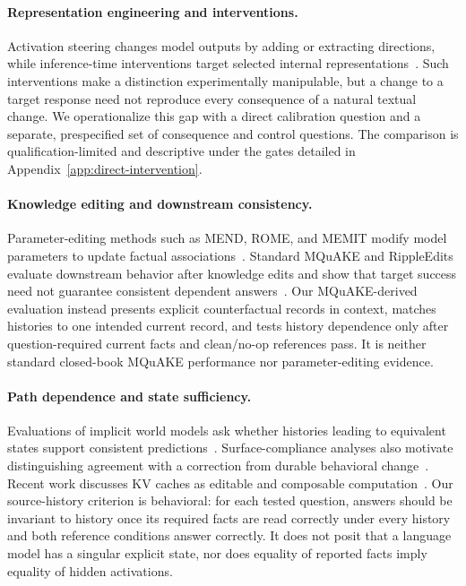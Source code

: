 \documentclass{article}
\begin{document}
\paragraph{Representation engineering and interventions.} Activation steering changes model outputs by adding or extracting directions, while inference-time interventions target selected internal representations~\citep{li2023inference,turner2023activation,zou2023representation}. Such interventions make a distinction experimentally manipulable, but a change to a target response need not reproduce every consequence of a natural textual change. We operationalize this gap with a direct calibration question and a separate, prespecified set of consequence and control questions. The comparison is qualification-limited and descriptive under the gates detailed in Appendix~\ref{app:direct-intervention}.

\paragraph{Knowledge editing and downstream consistency.} Parameter-editing methods such as MEND, ROME, and MEMIT modify model parameters to update factual associations~\citep{mitchell2022mend,meng2022rome,meng2023memit}. Standard MQuAKE and RippleEdits evaluate downstream behavior after knowledge edits and show that target success need not guarantee consistent dependent answers~\citep{zhong2023mquake,cohen2024ripple,ju2024shortcuts}. Our MQuAKE-derived evaluation instead presents explicit counterfactual records in context, matches histories to one intended current record, and tests history dependence only after question-required current facts and clean/no-op references pass. It is neither standard closed-book MQuAKE performance nor parameter-editing evidence.

\paragraph{Path dependence and state sufficiency.} Evaluations of implicit world models ask whether histories leading to equivalent states support consistent predictions~\citep{vafa2024worldmodel}. Surface-compliance analyses also motivate distinguishing agreement with a correction from durable behavioral change~\citep{gu2026surface}. Recent work discusses KV caches as editable and composable computation~\citep{li2026prefill}. Our source-history criterion is behavioral: for each tested question, answers should be invariant to history once its required facts are read correctly under every history and both reference conditions answer correctly. It does not posit that a language model has a singular explicit state, nor does equality of reported facts imply equality of hidden activations.
\end{document}
